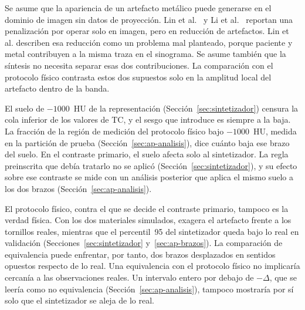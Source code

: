 Se asume que la apariencia de un artefacto metálico puede generarse en el dominio de imagen sin datos de proyección. Lin et al.~\cite{lin2019} y Li et al.~\cite{li2024} reportan una penalización por operar solo en imagen, pero en reducción de artefactos. Lin et al. describen esa reducción como un problema mal planteado, porque paciente y metal contribuyen a la misma traza en el sinograma. Se asume también que la síntesis no necesita separar esas dos contribuciones. La comparación con el protocolo físico contrasta estos dos supuestos solo en la amplitud local del artefacto dentro de la banda.

El suelo de $-1000$~HU de la representación (Sección~\ref{sec:sintetizador}) censura la cola inferior de los valores de TC, y el sesgo que introduce es siempre a la baja. La fracción de la región de medición del protocolo físico bajo $-1000$~HU, medida en la partición de prueba (Sección~\ref{sec:ap-analisis}), dice cuánto baja ese brazo del suelo. En el contraste primario, el suelo afecta solo al sintetizador. La regla preinscrita que debía tratarlo no se aplicó (Sección~\ref{sec:sintetizador}), y su efecto sobre ese contraste se mide con un análisis posterior que aplica el mismo suelo a los dos brazos (Sección~\ref{sec:ap-analisis}).

El protocolo físico, contra el que se decide el contraste primario, tampoco es la verdad física. Con los dos materiales simulados, exagera el artefacto frente a los tornillos reales, mientras que el percentil~95 del sintetizador queda bajo lo real en validación (Secciones~\ref{sec:sintetizador} y~\ref{sec:ap-brazos}). La comparación de equivalencia puede enfrentar, por tanto, dos brazos desplazados en sentidos opuestos respecto de lo real. Una equivalencia con el protocolo físico no implicaría cercanía a las observaciones reales. Un intervalo entero por debajo de $-\Delta$, que se leería como no equivalencia (Sección~\ref{sec:ap-analisis}), tampoco mostraría por sí solo que el sintetizador se aleja de lo real.

